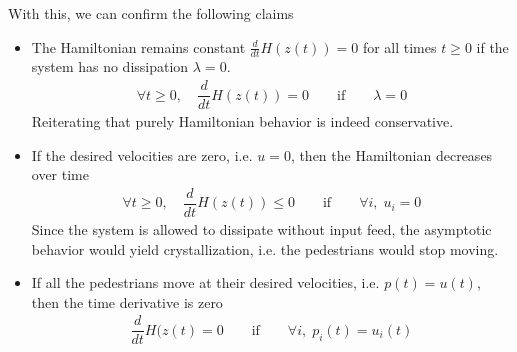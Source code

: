 With this, we can confirm the following claims
\begin{itemize}
    \item The Hamiltonian remains constant $\frac{d}{dt}H(z(t)) = 0$ for all times $t \geq 0$ if the system has no dissipation $\lambda = 0$. 
    \begin{align*}
        \forall t \geq 0,\quad \dfrac{d}{dt}H(z(t)) = 0 \qquad \text{if} \qquad \lambda = 0
    \end{align*}
    Reiterating that purely Hamiltonian behavior is indeed conservative.
    \item If the desired velocities are zero, i.e. $u = 0$, then the Hamiltonian decreases over time
    \begin{align*}
        \forall t \geq 0,\quad \dfrac{d}{dt}H(z(t)) \leq 0 \qquad \text{if} \qquad \forall i,\; u_i = 0
    \end{align*}
    Since the system is allowed to dissipate without input feed, the asymptotic behavior would yield crystallization, i.e. the pedestrians would stop moving.
    \item If all the pedestrians move at their desired velocities, i.e. $p(t) = u(t)$, then the time derivative is zero
    \begin{align*}
        \dfrac{d}{dt} H(z(t) = 0 \qquad \text{if} \qquad \forall i,\; p_i(t) = u_i(t)
    \end{align*}
\end{itemize}